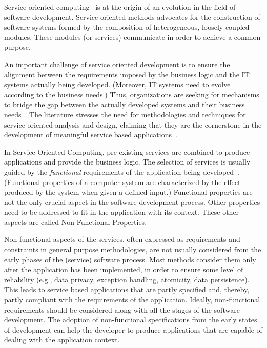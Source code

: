 
Service oriented computing~\cite{Papazoglou2007} is at the origin of an evolution in the field of software development.
Service oriented methods advocates for the construction of software systems formed by the composition of heterogeneous, loosely coupled modules.
These modules (or services) communicate in order to achieve a common purpose.

An important challenge of service oriented development is  to ensure the alignment between the requirements imposed by the business logic and the IT systems actually being developed.
(Moreover, IT systems need to evolve according to the business needs.)
Thus, organizations are seeking for mechanisms to bridge the gap between the actually developed systems and their business needs~\cite{bell}.
The literature stresses the need for methodologies and techniques for service oriented analysis and design, claiming that they are the cornerstone in the development of meaningful service based applications~\cite{5}.

In Service-Oriented Computing, pre-existing services are
combined to produce applications and provide the business logic.
The selection of services is usually guided by the \textit{functional} requirements of the application being developed~\cite{1,2,decastro1,PapazoglouH06}.
(Functional properties of a computer system are characterized by the effect produced by the system when given a defined input.)
Functional properties are not the only crucial aspect in the software development process.
Other properties need to be addressed to fit in the application with its context.
These other aspects are called Non-Functional Properties.

Non-functional aspects of the services, often expressed as requirements and constraints in general purpose methodologies, are not usually considered from the early phases of the (service) software process.
Most methods consider them only after the application has been implemented, in order to ensure some level of reliability (e.g., data privacy, exception handling, atomicity, data persistence).
This leads to service based applications that are partly specified and, thereby, partly compliant with the requirements of the application.
Ideally, non-functional requirements should be considered along with all the stages of the software development.
The adoption of non-functional specifications from the early states of development
can help the developer to produce applications that are capable of dealing with
the application context.

\bigskip

